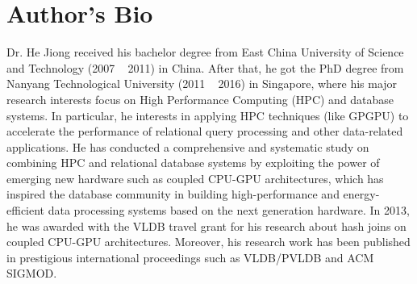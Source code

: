 \section{Author's Bio} \label{sec:bio}

Dr. He Jiong received his bachelor degree from East China University of Science and Technology (2007 ~ 2011) in China. After that, he got the PhD degree from Nanyang Technological University (2011 ~ 2016) in Singapore, where his major research interests focus on High Performance Computing (HPC) and database systems. In particular, he interests in applying HPC techniques (like GPGPU) to accelerate the performance of relational query processing and other data-related applications. He has conducted a comprehensive and systematic study on combining HPC and relational database systems by exploiting the power of emerging new hardware such as coupled CPU-GPU architectures, which has inspired the database community in building high-performance and energy-efficient data processing systems based on the next generation hardware. In 2013, he was awarded with the VLDB travel grant for his research about hash joins on coupled CPU-GPU architectures. Moreover, his research work has been published in prestigious international proceedings such as VLDB/PVLDB and ACM SIGMOD.